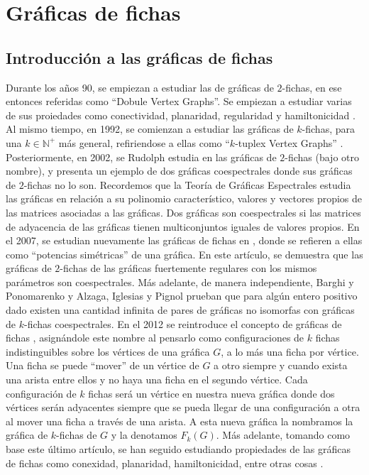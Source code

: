 \chapter{Gr\'aficas de fichas}%
\label{cap:fichass}

\section{Introducci\'on a las gr\'aficas de fichas}%
\label{sec:intro-fichas}


    Durante los a\~{n}os 90, se empiezan a estudiar las de gr\'aficas de
$2$-fichas, en ese entonces referidas como ``Dobule Vertex Graphs''. Se empiezan
a estudiar varias de sus proiedades como conectividad, planaridad, regularidad y
hamiltonicidad \cite{alaviPlanarity, alaviDVGraphs, alaviHamilt, zhuConnect}. Al
mismo tiempo, en 1992, se comienzan a estudiar las gr\'aficas de $k$-fichas,
para una $k \in \mathbb{N^{+}}$ m\'as general, refiriendose a ellas como
``$k$-tuplex Vertex Graphs'' \cite{zhuNTuples}. Posteriormente, en 2002, se
Rudolph estudia en \cite{rudolphGInv} las gr\'aficas de $2$-fichas (bajo otro
nombre), y presenta un ejemplo de dos gr\'aficas coespectrales donde sus
gr\'aficas de $2$-fichas no lo son. Recordemos que la Teor\'ia de Gr\'aficas
Espectrales estudia las gr\'aficas en relaci\'on a su polinomio caracter\'istico,
valores y vectores propios de las matrices asociadas a las gr\'aficas. Dos
gr\'aficas son coespectrales si las matrices de adyacencia de las gr\'aficas
tienen multiconjuntos iguales de valores propios. En el 2007, se estudian
nuevamente las gr\'aficas de fichas en \cite{audeanetSymPower}, donde se
refieren a ellas como ``potencias sim\'etricas'' de una gr\'afica. En este
art\'iculo, se demuestra que las gr\'aficas de $2$-fichas de las gr\'aficas
fuertemente regulares con los mismos par\'ametros son coespectrales. M\'as
adelante, de manera independiente, Barghi y Ponomarenko
\cite{barghi-ponomarenko} y Alzaga, Iglesias y Pignol \cite{alzagaSymPower}
prueban que para alg\'un entero positivo dado existen una cantidad infinita de
pares de gr\'aficas no isomorfas con gr\'aficas de $k$-fichas coespectrales. En
el 2012 se reintroduce el concepto de gr\'aficas de fichas \cite{fabilaToken},
asign\'andole este nombre al pensarlo como configuraciones de $k$ fichas
indistinguibles sobre los v\'ertices de una gr\'afica $G$, a lo m\'as una ficha
por v\'ertice. Una ficha se puede ``mover'' de un v\'ertice de $G$ a otro
siempre y cuando exista una arista entre ellos y no haya una ficha en el segundo
v\'ertice. Cada configuraci\'on de $k$ fichas ser\'a un v\'ertice en nuestra
nueva gr\'afica donde dos v\'ertices ser\'an adyacentes siempre que se pueda
llegar de una configuraci\'on a otra al mover una ficha a trav\'es de una
arista. A esta nueva gr\'afica la nombramos la gr\'afica de $k$-fichas de $G$ y
la denotamos $F_k(G)$. M\'as adelante, tomando como base este \'ultimo
art\'iculo, se han seguido estudiando propiedades de las gr\'aficas de fichas
como conexidad, planaridad, hamiltonicidad, entre otras cosas
\cite{carballosaRegPlan, leaConnect, riveraHamilt, adameHamilt, leaEConnect}.

